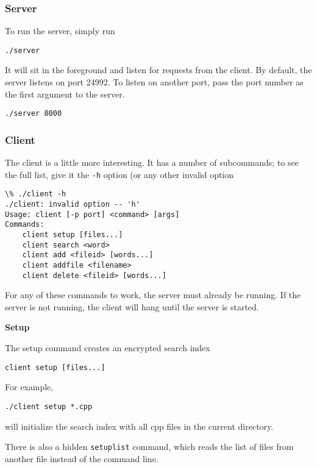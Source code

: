 \subsubsection{Server}

To run the server, simply run

\begin{lstlisting}
./server
\end{lstlisting}

It will sit in the foreground and listen for requests from the client.
By default, the server listens on port 24992.
To listen on another port, pass the port number as the first argument to the server.

\begin{lstlisting}
./server 8000
\end{lstlisting}

\subsubsection{Client}

The client is a little more interesting.
It has a number of subcommands;
to see the full list, give it the \texttt{-h} option (or any other invalid option

\begin{lstlisting}
\% ./client -h
./client: invalid option -- 'h'
Usage: client [-p port] <command> [args]
Commands:
    client setup [files...]
    client search <word>
    client add <fileid> [words...]
    client addfile <filename>
    client delete <fileid> [words...]
\end{lstlisting}

For any of these commands to work, the server must already be running.
If the server is not running, the client will hang until the server is started.

\noindent\textbf{Setup}

The setup command creates an encrypted search index

\begin{lstlisting}
client setup [files...]
\end{lstlisting}

For example,

\begin{lstlisting}
./client setup *.cpp
\end{lstlisting}

will initialize the search index with all cpp files in the current directory.

There is also a hidden \texttt{setuplist} command, which reads the list of files from another file
instead of the command line.

